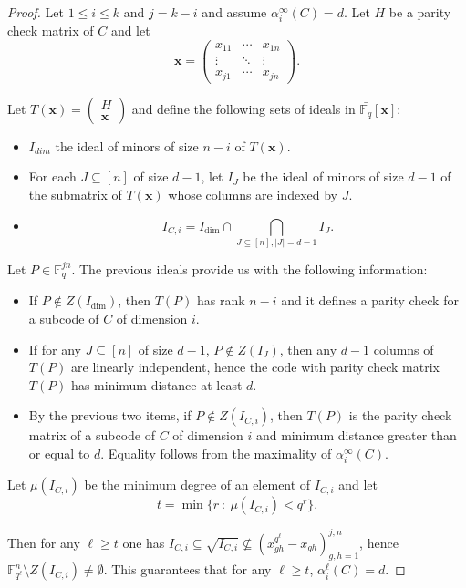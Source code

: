 \documentclass[12pt]{amsart}
\numberwithin{equation}{section}
\theoremstyle{definition}
\begin{document}
\begin{proof}
Let $1\leq i\leq k$ and $j=k-i$ and assume $\alpha_i^\infty(C)=d$. Let $H$ be a parity check matrix of $C$ and let $$\mathbf{x}=\begin{pmatrix} x_{11}&\cdots&x_{1n}\\ \vdots&\ddots&\vdots\\
    x_{j1}&\cdots&x_{jn}\end{pmatrix}.$$

Let $T(\mathbf{x})=\begin{pmatrix} H\\ \mathbf{x}\end{pmatrix}$ and define the following sets of ideals in $\bar{\mathbb{F}_q}[\mathbf{x}]$:
\begin{itemize}
\item $I_{dim}$ the ideal of minors of size $n-i$ of $T(\mathbf{x})$.
\item For each $J\subseteq [n]$ of size $d-1$, let $I_J$ be the ideal of minors of size $d-1$ of the submatrix of $T(\mathbf{x})$ whose columns are indexed by $J$.
\item $$I_{C,i}=I_{\dim}\cap\bigcap_{J\subseteq[n], |J|=d-1} I_J.$$
\end{itemize}

Let $P\in\mathbb{F}_q^{jn}$. The previous ideals provide us with the following information:
\begin{itemize}
\item If $P\notin Z(I_{\dim})$, then $T(P)$ has rank $n-i$ and it defines a parity check for a subcode of $C$ of dimension $i$.
\item If for any $J\subseteq [n]$ of size $d-1$, $P\notin Z(I_J)$, then any $d-1$ columns of $T(P)$ are linearly independent, hence the code with parity check matrix $T(P)$ has minimum distance at least $d$.
\item By the previous two items, if $P\notin Z(I_{C,i})$, then $T(P)$ is the parity check matrix of a subcode of $C$ of dimension $i$ and minimum distance greater than or equal to $d$. Equality follows from the maximality of $\alpha_i^\infty(C)$.
\end{itemize}

Let $\mu(I_{C,i})$ be the minimum degree of an element of $I_{C,i}$ and let $$t=\min\{r\ :\ \mu(I_{C,i})< q^r\}.$$

Then for any $\ell\geq t$ one has $I_{C,i}\subseteq\sqrt {I_{C,i}}\not\subseteq (x_{gh}^{q^\ell}-x_{gh})_{g,h=1}^{j,n}$, hence $\mathbb{F}_{q^\ell}^n\setminus Z(I_{C,i})\neq \emptyset$. This guarantees that for any $\ell\geq t$, $\alpha_i^\ell(C)=d$.
\end{proof}
\end{document}
